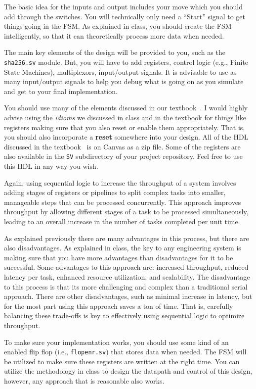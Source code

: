 \documentclass{article}
\begin{document}
The basic idea for the inputs and output includes your move which you
should add through the switches.  You will technically only need a
``Start'' signal to get things going in the FSM.  As explained in
class, you should create the FSM intelligently, so that it can
theoretically process more data when needed.

The main key elements of the design will be provided to you, such as
the \verb!sha256.sv! module.  But, you will have to add registers,
control logic (e.g., Finite State Machines), multiplexors, input/output signals.
It is advisable to use as many input/output signals to help you debug
what is going on as you simulate and get to your final
implementation.

You should use many of the elements discussed in our
textbook~\cite{ddca-riscv}.  I would highly advise using the
\textit{idioms} we discussed in class 
and in the textbook for things
like registers making sure that you also reset or enable them appropriately.
That is, you should also incorporate a \textbf{reset} somewhere into your
design.  All of the HDL discussed in the textbook~\cite{ddca-riscv} is
on Canvas as a zip file.  Some of the registers are also available in
the \verb!SV! subdirectory of your project repository.
Feel free to use this HDL in any way you wish.

Again, using sequential logic to increase the throughput of a system involves
adding stages of registers or pipelines to split complex tasks into
smaller, manageable steps that can be processed concurrently. This
approach improves throughput by allowing different stages of a task to
be processed simultaneously, leading to an overall increase in the
number of tasks completed per unit time.

As explained previously there are many advantages in this process, but
there are also disadvantages.  As explained in class, the key to any
engineering system is making sure that you have more advantages than
disadvantages for it to be successful.  Some advantages to this
approach are: increased throughput, reduced latency per task, enhanced
resource utilization, and scalability.  The disadvantage to this
process is that its more challenging and complex than a traditional
serial approach.  There are other disadvantages, such as minimal
increase in latency, but for the most part using this approach saves a
ton of time.  That is, carefully balancing these trade-offs is key to
effectively using sequential logic to optimize throughput.

To make sure your implementation works, you should use some kind of an
enabled flip
flop (i.e., \verb!flopenr.sv!) that stores data when needed.
The FSM will be utilized to make sure these registers are written at
the right time.  You can utilize the methodology in class to design
the datapath and control of this design, however, any approach that is
reasonable also works.
\end{document}

